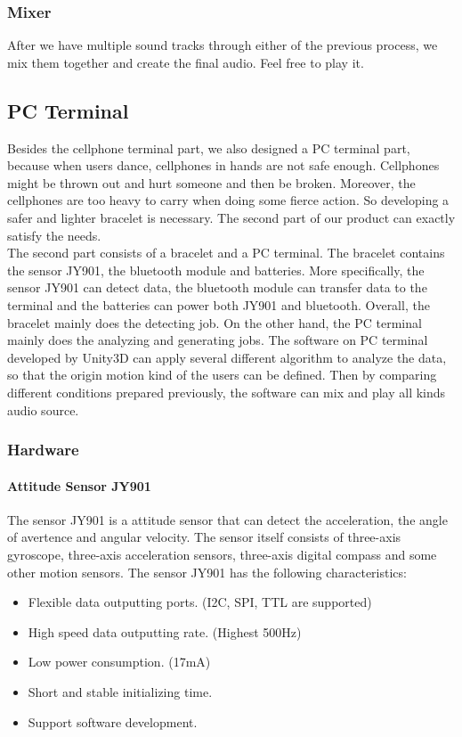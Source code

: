 \subsubsection{Mixer}

   After we have multiple sound tracks through either of the previous process,
   we mix them together and create the final audio. Feel free to play it.

\subsection{PC Terminal}
\hspace*{2em}Besides the cellphone terminal part, we also designed a PC terminal part, because when users dance, cellphones in hands are not safe enough. Cellphones might be thrown out and hurt someone and then be broken. Moreover, the cellphones are too heavy to carry when doing some fierce action. So developing a safer and lighter bracelet is necessary. The second part of our product can exactly satisfy the needs. \\
\hspace*{2em}The second part consists of a bracelet and a PC terminal. The bracelet contains the sensor JY901, the bluetooth module and batteries. More specifically, the sensor JY901 can detect data, the bluetooth module can transfer data to the terminal and the batteries can power both JY901 and bluetooth. Overall, the bracelet mainly does the detecting job. On the other hand, the PC terminal mainly does the analyzing and generating jobs. The software on PC terminal developed by Unity3D can apply several different algorithm to analyze the data, so that the origin motion kind of the users can be defined. Then by comparing different conditions prepared previously, the software can mix and play all kinds audio source.  \\
\subsubsection{Hardware}
\paragraph{Attitude Sensor JY901}
\hspace*{2em}The sensor JY901 is a attitude sensor that can detect the acceleration, the angle of avertence and angular velocity. The sensor itself consists of three-axis gyroscope, three-axis acceleration sensors, three-axis digital compass and some other motion sensors. The sensor JY901 has the following characteristics:
\begin{itemize}
\item Flexible data outputting ports. (I2C, SPI, TTL are supported)
\item High speed data outputting rate. (Highest 500Hz)
\item Low power consumption. (17mA)
\item Short and stable initializing time. 
\item Support software development. 
\end{itemize}
